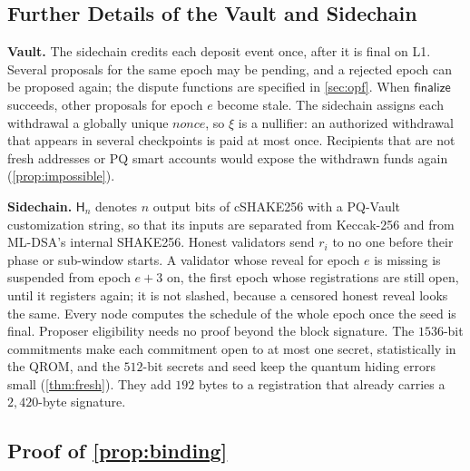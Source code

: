\documentclass[10pt,journal,compsoc]{IEEEtran}
\theoremstyle{tplain}
\theoremstyle{tdef}
\theoremstyle{remark}
\newcommand{\Hash}{\mathsf{H}}
\begin{document}
\subsection{Further Details of the Vault and Sidechain}
\noindent\textbf{Vault.} The sidechain credits each deposit event once, after it is final on L1. Several proposals for the same epoch may be pending, and a rejected epoch can be proposed again; the dispute functions are specified in \cref{sec:opf}. When $\mathsf{finalize}$ succeeds, other proposals for epoch $e$ become stale. The sidechain assigns each withdrawal a globally unique $\mathit{nonce}$, so $\xi$ is a nullifier: an authorized withdrawal that appears in several checkpoints is paid at most once. Recipients that are not fresh addresses or PQ smart accounts would expose the withdrawn funds again (\cref{prop:impossible}).

\noindent\textbf{Sidechain.} $\Hash_n$ denotes $n$ output bits of cSHAKE256 with a PQ-Vault customization string, so that its inputs are separated from Keccak-256 and from ML-DSA's internal SHAKE256. Honest validators send $r_i$ to no one before their phase or sub-window starts. A validator whose reveal for epoch $e$ is missing is suspended from epoch $e+3$ on, the first epoch whose registrations are still open, until it registers again; it is not slashed, because a censored honest reveal looks the same. Every node computes the schedule of the whole epoch once the seed is final. Proposer eligibility needs no proof beyond the block signature. The $1536$-bit commitments make each commitment open to at most one secret, statistically in the QROM, and the $512$-bit secrets and seed keep the quantum hiding errors small (\cref{thm:fresh}). They add $192$ bytes to a registration that already carries a $2{,}420$-byte signature.

\subsection{Proof of \cref{prop:binding}}
\end{document}
